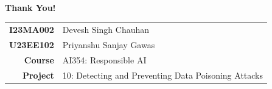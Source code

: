 \documentclass[aspectratio=169]{beamer}
\begin{document}
	\begin{frame}
		\begin{center}
			\vspace{1em}
			{\LARGE \textbf{Thank You!}}
			
			\vspace{1.5em}
			
			\vspace{1.5em}
			\begin{tabular}{rl}
				\textbf{I23MA002} & Devesh Singh Chauhan \\[0.3em]
				\textbf{U23EE102} & Priyanshu Sanjay Gawas \\[0.8em]
				\textbf{Course}   & AI354: Responsible AI \\[0.3em]
				\textbf{Project}  & 10: Detecting and Preventing Data Poisoning Attacks \\
			\end{tabular}
			
			\vspace{1.5em}
			
		\end{center}
	\end{frame}
	
\end{document}
